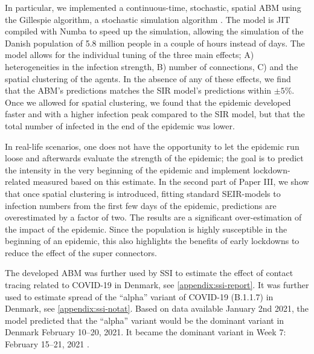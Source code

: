 In particular, we implemented a continuous-time, stochastic, spatial ABM using the Gillespie algorithm, a stochastic simulation algorithm \autocite{gillespieExactStochasticSimulation1977}. The model is JIT compiled with Numba \autocite{lamNumbaLLVMbasedPython2015} to speed up the simulation, allowing the simulation of the Danish population of 5.8 million people in a couple of hours instead of days. The model allows for the individual tuning of the three main effects; A) heterogeneities in the infection strength, B) number of connections, C) and the spatial clustering of the agents. In the absence of any of these effects, we find that the ABM's predictions matches the SIR model's predictions within $\pm 5 \%$. Once we allowed for spatial clustering, we found that the epidemic developed faster and with a higher infection peak compared to the SIR model, but that the total number of infected in the end of the epidemic was lower.

In real-life scenarios, one does not have the opportunity to let the epidemic run loose and afterwards evaluate the strength of the epidemic; the goal is to predict the intensity in the very beginning of the epidemic and implement lockdown-related measured based on this estimate. In the second part of Paper III, we show that once spatial clustering is introduced, fitting standard SEIR-models to infection numbers from the first few days of the epidemic, predictions are overestimated by a factor of two. The results are a significant over-estimation of the impact of the epidemic. Since the population is highly susceptible in the beginning of an epidemic, this also highlights the benefits of early lockdowns to reduce the effect of the super connectors.

The developed ABM was further used by SSI to estimate the effect of contact tracing related to COVID-19 in Denmark, see \autoref{appendix:ssi-report}. It was further used to estimate spread of the ``alpha'' variant of COVID-19 (B.1.1.7) in Denmark, see \autoref{appendix:ssi-notat}. Based on data available January 2nd 2021, the model predicted that the ``alpha'' variant would be the dominant variant in Denmark February 10--20, 2021. It became the dominant variant in Week 7: February 15--21, 2021 \autocite{bagerRiskHospitalisationAssociated2021}.
